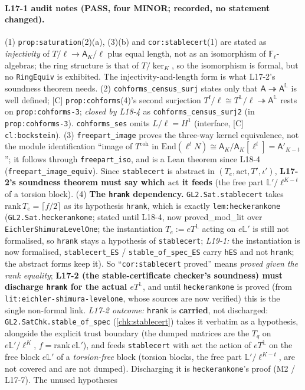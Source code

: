 \paragraph{L17-1 audit notes (PASS, four MINOR; recorded, no statement changed).}
(1) \texttt{prop:saturation}(2)(a), (3)(b) and \texttt{cor:stablecert}(1) are stated as \emph{injectivity} of $T/\ell\to\mathsf A_K/\ell$
plus equal length, not as an isomorphism of $\mathbb F_\ell$-algebras; the ring structure is that of $T/\ker_K$, so the isomorphism
is formal, but no \texttt{RingEquiv} is exhibited. The injectivity-and-length form is what L17-2's soundness theorem needs.
(2) \texttt{cohforms\_census\_surj} states only that $\mathsf A\twoheadrightarrow\mathsf A^{\mathbb L}$ is well defined; [C]
\texttt{prop:cohforms}(4)'s second surjection $T^{\mathrm f}/\ell\cong T^{\mathbb L}/\ell\twoheadrightarrow\mathsf A^{\mathbb L}$ rests on
\texttt{prop:cohforms-3}; \emph{closed by L18-4} as \texttt{cohforms\_census\_surj2} (in \texttt{prop:cohforms-3}). \texttt{cohforms\_ses}
omits $L/\ell=H^1$ (interface, [C] \texttt{cl:bockstein}).
(3) \texttt{freepart\_image} proves the three-way kernel equivalence, not the module identification ``image of $T^{\mathrm{coh}}$ in
$\mathrm{End}(\ell^tN)\cong\mathsf A_K/\mathsf A_K[\ell^t]=\mathsf A'_{K-t}$''; it follows through \texttt{freepart\_iso}, and is a Lean
theorem since L18-4 (\texttt{freepart\_image\_equiv}). Since \texttt{stablecert} is abstract in $(T_e,\mathrm{act},T',\iota')$, \textbf{L17-2's soundness theorem must say which
$\mathrm{act}$ it feeds} (the free part $\mathbb L'/\ell^{K-t}$ of a torsion block).
(4) \textbf{The \texttt{hrank} dependency.} \texttt{GL2.Sat.stablecert} takes $\mathrm{rank}\,T_e=\lceil f/2\rceil$ as its hypothesis
\texttt{hrank}, which is exactly \texttt{lem:heckerankone} (\texttt{GL2.Sat.heckerankone}; \textsf{stated} until L18-4, now
\textsf{proved\_mod\_lit} over \texttt{EichlerShimuraLevelOne}; the instantiation $T_e:=eT^{\mathbb L}$ acting on $e\mathbb L'$ is still
not formalised, so \texttt{hrank} stays a hypothesis of \texttt{stablecert}; \emph{L19-1:} the instantiation is now formalised,
\texttt{stablecert\_ES} / \texttt{stable\_of\_spec\_ES} carry \texttt{hES} and not \texttt{hrank}; the abstract forms keep it). So
``\texttt{cor:stablecert} proved'' means \emph{proved given the rank equality}; \textbf{L17-2 (the stable-certificate checker's
soundness) must discharge \texttt{hrank} for the actual $eT^{\mathbb L}$}, and until \texttt{heckerankone} is proved (from
\texttt{lit:eichler-shimura-levelone}, whose sources are now verified) this is the single non-formal link. \emph{L17-2 outcome:} \texttt{hrank} is \textbf{carried}, not discharged: \texttt{GL2.SatChk.stable\_of\_spec} (\ref{chk:stablecert}) takes it verbatim as a hypothesis, alongside the explicit trust boundary (the dumped matrices are the $T_q$ on $e\mathbb L'/\ell^K$, $f=\mathrm{rank}\,e\mathbb L'$), and feeds \texttt{stablecert} with $\mathrm{act}$ the action of $eT^{\mathbb L}$ on the free block $e\mathbb L'$ of a \emph{torsion-free} block (torsion blocks, the free part $\mathbb L'/\ell^{K-t}$, are not covered and are not dumped). Discharging it is \texttt{heckerankone}'s proof (M2 / L17-7). The unused hypotheses
